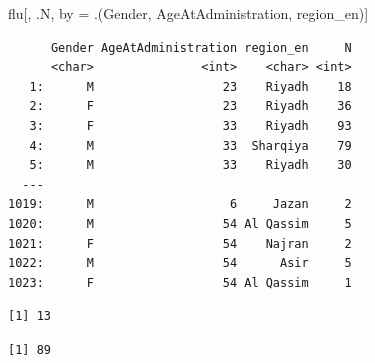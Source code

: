 \documentclass[
  letterpaper,
  DIV=11,
  numbers=noendperiod]{scrreprt}
\newenvironment{Shaded}{\begin{snugshade}}{\end{snugshade}}
\newcommand{\FunctionTok}[1]{\textcolor[rgb]{0.28,0.35,0.67}{#1}}
\newcommand{\NormalTok}[1]{\textcolor[rgb]{0.00,0.23,0.31}{#1}}
\newcommand{\OtherTok}[1]{\textcolor[rgb]{0.00,0.23,0.31}{#1}}
\newcommand{\SpecialCharTok}[1]{\textcolor[rgb]{0.37,0.37,0.37}{#1}}
\begin{document}
\begin{Shaded}
\begin{Highlighting}[]
\NormalTok{flu[, .N, by }\OtherTok{=}\NormalTok{ .(Gender, AgeAtAdministration, region\_en)]}
\end{Highlighting}
\end{Shaded}

\begin{verbatim}
      Gender AgeAtAdministration region_en     N
      <char>               <int>    <char> <int>
   1:      M                  23    Riyadh    18
   2:      F                  23    Riyadh    36
   3:      F                  33    Riyadh    93
   4:      M                  33  Sharqiya    79
   5:      M                  33    Riyadh    30
  ---                                           
1019:      M                   6     Jazan     2
1020:      M                  54 Al Qassim     5
1021:      F                  54    Najran     2
1022:      M                  54      Asir     5
1023:      F                  54 Al Qassim     1
\end{verbatim}

\begin{Shaded}
\end{Shaded}

\begin{verbatim}
[1] 13
\end{verbatim}

\begin{Shaded}
\end{Shaded}

\begin{verbatim}
[1] 89
\end{verbatim}

\begin{Shaded}
\end{Shaded}
\end{document}
